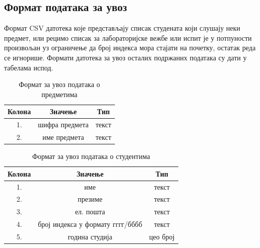 \documentclass[a4paper, 12pt, diplomski]{etfcyr}
\begin{document}
			\subsection{Формат података за увоз}
				\begin{justify}
					Формат CSV датотека које представљају списак студената који слушају неки предмет, или рецимо списак за лабораторијске вежбе или испит је у потпуности произвољан уз ограничење да број индекса мора стајати на почетку, остатак реда се игнорише.
					Формати датотека за увоз осталих подржаних података су дати у табелама испод.
				\end{justify}
				\begin{table}[H]
					\centering
					\begin{tabular}{ c|c|c }
						Колона & Значење & Тип \\
						\hline\hline
						1. & шифра предмета & текст \\
						2. & име предмета & текст \\
						\hline
					\end{tabular}
					\caption{Формат за увоз података о предметима}
					\label{table:2}
				\end{table}
				\begin{table}[H]
					\centering
					\begin{tabular}{ c|c|c }
						Колона & Значење & Тип \\
						\hline\hline
						1. & име & текст \\
						2. & презиме & текст \\
						3. & ел. пошта & текст \\
						4. & број индекса у формату гггг/бббб & текст \\
						5. & година студија & цео број \\
						\hline
					\end{tabular}
					\caption{Формат за увоз података о студентима}
					\label{table:3}
				\end{table}

			\newpage
\end{document}
